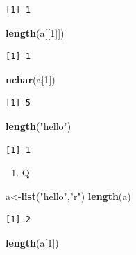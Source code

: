 \documentclass[]{book}
\newenvironment{Shaded}{\begin{snugshade}}{\end{snugshade}}
\newcommand{\DecValTok}[1]{\textcolor[rgb]{0.00,0.00,0.81}{#1}}
\newcommand{\KeywordTok}[1]{\textcolor[rgb]{0.13,0.29,0.53}{\textbf{#1}}}
\newcommand{\NormalTok}[1]{#1}
\newcommand{\StringTok}[1]{\textcolor[rgb]{0.31,0.60,0.02}{#1}}
\providecommand{\tightlist}{%
  \setlength{\itemsep}{0pt}\setlength{\parskip}{0pt}}
\theoremstyle{definition}
\theoremstyle{definition}
\theoremstyle{definition}
\theoremstyle{remark}
\begin{document}
\begin{verbatim}
[1] 1
\end{verbatim}

\begin{Shaded}
\begin{Highlighting}[]
\KeywordTok{length}\NormalTok{(a[[}\DecValTok{1}\NormalTok{]])}
\end{Highlighting}
\end{Shaded}

\begin{verbatim}
[1] 1
\end{verbatim}

\begin{Shaded}
\begin{Highlighting}[]
\KeywordTok{nchar}\NormalTok{(a[}\DecValTok{1}\NormalTok{])}
\end{Highlighting}
\end{Shaded}

\begin{verbatim}
[1] 5
\end{verbatim}

\begin{Shaded}
\begin{Highlighting}[]
\KeywordTok{length}\NormalTok{(}\StringTok{"hello"}\NormalTok{)}
\end{Highlighting}
\end{Shaded}

\begin{verbatim}
[1] 1
\end{verbatim}

\begin{enumerate}
\def\labelenumi{\arabic{enumi}.}
\tightlist
\item
  Q
\end{enumerate}

\begin{Shaded}
\begin{Highlighting}[]
\NormalTok{a<-}\KeywordTok{list}\NormalTok{(}\StringTok{"hello"}\NormalTok{,}\StringTok{"r"}\NormalTok{)}
\KeywordTok{length}\NormalTok{(a)}
\end{Highlighting}
\end{Shaded}

\begin{verbatim}
[1] 2
\end{verbatim}

\begin{Shaded}
\begin{Highlighting}[]
\KeywordTok{length}\NormalTok{(a[}\DecValTok{1}\NormalTok{])}
\end{Highlighting}
\end{Shaded}
\end{document}
